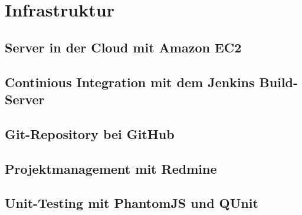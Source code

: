 \chapter{Infrastruktur}
\label{infrastruktur}

\section{Server in der Cloud mit Amazon EC2}

\section{Continious Integration mit dem Jenkins Build-Server}

\section{Git-Repository bei GitHub}

\section{Projektmanagement mit Redmine}

\section{Unit-Testing mit PhantomJS und QUnit}